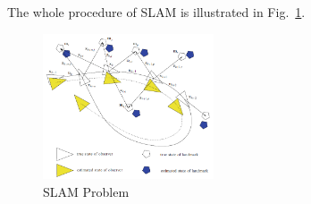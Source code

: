 \documentclass[conference]{IEEEtran}
\begin{document}
\par The whole procedure of SLAM is illustrated in Fig.~\ref{fig:SLAM}.
	\begin{figure}[htbp]
		\centering
		\includegraphics[width=0.45\textwidth]{SLAM.png}
		\caption{SLAM Problem}
		\label{fig:SLAM}
	\end{figure}

\end{document}
